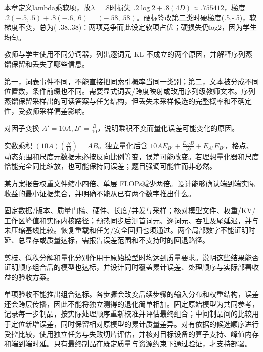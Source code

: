 \begin{exercises}
\begin{exercise}
\begin{solution}
本章定义lambda乘软项，故$\lambda=.8$时损失 $.2\log2+.8(4D)\approx.755412$，梯度 $.2(-.5,.5)+.8(-.6,.6)=(-.58,.58)$。硬标签改第二类时硬梯度(.5,-.5)，软梯度不变，总为(-.38,.38)：两项竞争而此设定软项占优；硬损失仍log2，因为学生均匀。
\end{solution}
\end{exercise}

\begin{exercise} 教师与学生使用不同分词器，列出逐词元 KL 不成立的两个原因，并解释序列蒸馏保留和丢失了哪些信息。

\begin{solution}
第一，词表事件不同，不能直接把同索引概率当同一类别；第二，文本被分成不同位置数，条件前缀也不同。需要显式词表/跨度映射或改用序列级教师文本。序列蒸馏保留采样出的可读答案与任务结构，但丢失未采样候选的完整概率和不确定性，受教师采样偏差影响。
\end{solution}
\end{exercise}

\begin{exercise}\optional 对因子变换 $A'=10A,B'=\frac{B}{10}$，说明乘积不变而量化误差可能变化的原因。

\begin{solution}
实数乘积 $(10A)(\frac{B}{10})=AB$。独立量化后含 $10A E_{B'}+\frac{E_{A'}B}{10}+E_{A'}E_{B'}$，格点、动态范围和尺度元数据未必按反向比例等变，误差可能改变。若理想量化器和尺度恰能完全同比缩放，也可能保持同误差；题目强调可能性而非必然。
\end{solution}
\end{exercise}

\begin{exercise} 某方案报告权重文件缩小四倍、单层 FLOPs减少两倍。设计能够确认端到端实际收益的最小证据集合，并明确不能从已有两个数字推出什么。

\begin{solution}
固定数据/版本、质量门槛、硬件、长度/并发与采样；核对模型文件、权重/KV/工作区峰值和实际内核路径；预热同步后测首词元、逐词元、吞吐及尾延迟，并与未压缩基线比较。恢复重载和任务/安全回归也须通过。两个局部数字不能证明时延、总显存或质量达标，需报告误差范围和不支持时的回退路径。
\end{solution}
\end{exercise}

\begin{exercise} 剪枝、低秩分解和量化分别作用于原始模型时均达到质量要求。说明这些结果能否证明顺序组合后的模型也达标，并设计同时覆盖累计误差、处理顺序与实际部署收益的验收方案。

\begin{solution}
单项验收不能推出组合达标。各步骤会改变后续步骤的输入分布和权重结构，误差还会跨层传播，因此不能将独立测得的退化简单相加。固定原始模型为共同参考，记录每一步制品，按实际处理顺序重新校准并评估最终组合；中间制品间的比较用于定位新增误差，同时保留相对原模型的累计质量差异。对有依据的候选顺序进行受控比较，使用独立任务与失败切片评估，并核对目标设备的算子支持、峰值内存和端到端时延。只有最终制品在既定质量与资源约束下通过验证，才支持部署。
\end{solution}
\end{exercise}

\end{exercises}
